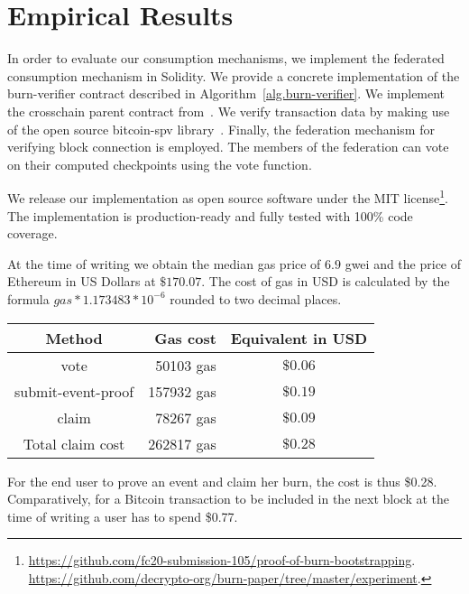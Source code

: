 \section{Empirical Results}
In order to evaluate our consumption mechanisms, we implement the federated consumption mechanism in Solidity. We provide a concrete implementation of the \textsf{burn-verifier} contract described in Algorithm~\ref{alg.burn-verifier}. We implement the \textsf{crosschain} parent contract from~\cite{pow-sidechains}. We verify transaction data by making use of the open source bitcoin-spv library~\cite{bitcoin-spv-library}. Finally, the federation mechanism for verifying block connection is employed. The members of the federation can vote on their computed checkpoints using the \textsf{vote} function.

We release our implementation as open source software under the MIT license\footnote{
    \ifanonymous
        \url{https://github.com/fc20-submission-105/proof-of-burn-bootstrapping}.
    \else
        \url{https://github.com/decrypto-org/burn-paper/tree/master/experiment}.
    \fi
}.
The implementation is production-ready and fully tested with 100\% code coverage.

At the time of writing we obtain the median gas price of $6.9$ gwei and the price of Ethereum in US Dollars at $\$170.07$. The cost of gas in USD is calculated by the formula $gas * 1.173483 * 10^{-6}$ rounded to two decimal places.

\begin{center}
    \begin{tabular}{ |c|r|c| }
     \hline
     Method & Gas cost & Equivalent in USD \\
     \hline
     \textsf{vote}                  & 50103 gas  & $\$0.06$ \\
     \hline
     \textsf{submit-event-proof}    & 157932 gas & $\$0.19$ \\
     \textsf{claim}                 & 78267 gas  & $\$0.09$ \\
     Total claim cost               & 262817 gas & $\$0.28$ \\
     \hline
    \end{tabular}
\end{center}

For the end user to prove an event and claim her burn, the cost is thus \$0.28. Comparatively, for a Bitcoin transaction to be included in the next block at the time of writing a user has to spend \$0.77.
